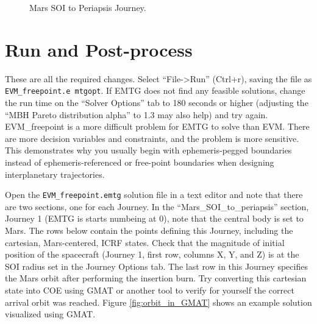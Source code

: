 \documentclass[11pt]{article}
\begin{document}
\begin{figure}[H]
	\centering
	\caption{\label{fig:mars_soi_to_periapsis_options}Mars \ac{SOI} to Periapsis Journey.}
\end{figure}


\section{Run and Post-process}
\label{sec:run_and_post_process_jb}

These are all the required changes. Select “File-\textgreater Run” (Ctrl+r), saving the file as \texttt{EVM\_freepoint.e mtgopt}. If \ac{EMTG} does not find any feasible solutions, change the run time on the ``Solver Options'' tab to 180 seconds or higher (adjusting the ``\acs{MBH} Pareto distribution alpha'' to 1.3 may also help) and try again. EVM\_freepoint is a more difficult problem for \ac{EMTG} to solve than EVM. There are more decision variables and constraints, and the problem is more sensitive. This demonstrates why you usually begin with ephemeris-pegged boundaries instead of ephemeris-referenced or free-point boundaries when designing interplanetary trajectories.

\noindent Open the \texttt{EVM\_freepoint.emtg} solution file in a text editor and note that there are two sections, one for each Journey. In the ``Mars\_SOI\_to\_periapsis'' section, Journey 1 (\ac{EMTG} is starts numbeing at 0), note that the central body is set to Mars. The rows below contain the points defining this Journey, including the cartesian, Mars-centered, \acs{ICRF} states. Check that the magnitude of initial position of the spacecraft (Journey 1, first row, columns X, Y, and Z) is at the \ac{SOI} radius set in the Journey Options tab. The last row in this Journey specifies the Mars orbit after performing the insertion burn. Try converting this cartesian state into COE using \ac{GMAT} or another tool to verify for yourself the correct arrival orbit was reached. Figure \ref{fig:orbit_in_GMAT} shows an example solution visualized using \ac{GMAT}.
\end{document}
